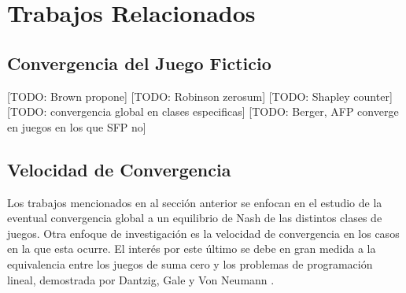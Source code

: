 \chapter{Trabajos Relacionados}  \label{cap:relwork}

\section{Convergencia del Juego Ficticio}

[TODO: Brown propone]
[TODO: Robinson zerosum]
[TODO: Shapley counter]
[TODO: convergencia global en clases especificas]
[TODO: Berger, AFP converge en juegos en los que SFP no]

\section{Velocidad de Convergencia}

Los trabajos mencionados en al sección anterior se enfocan en el estudio de la eventual convergencia global
a un equilibrio de Nash de las distintos clases de juegos. Otra enfoque de investigación es la velocidad de
convergencia en los casos en la que esta ocurre.
El interés por este último se debe en gran medida a la equivalencia entre los juegos de suma cero y
los problemas de programación lineal, demostrada por Dantzig, Gale y Von Neumann \cite{fplp:equiv}.
